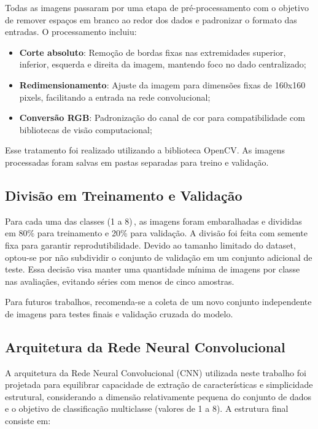 Todas as imagens passaram por uma etapa de pré-processamento com o objetivo de remover 
espaços em branco ao redor dos dados e padronizar o formato das entradas. O processamento incluiu:

\begin{itemize}
\item \textbf{Corte absoluto}: Remoção de bordas fixas nas extremidades superior, inferior, 
esquerda e direita da imagem, mantendo foco no dado centralizado;
\item \textbf{Redimensionamento}: Ajuste da imagem para dimensões fixas de 160x160 pixels, 
facilitando a entrada na rede convolucional;
\item \textbf{Conversão RGB}: Padronização do canal de cor para compatibilidade com bibliotecas 
de visão computacional;
\end{itemize}

Esse tratamento foi realizado utilizando a biblioteca OpenCV. As imagens processadas foram salvas 
em pastas separadas para treino e validação.
\subsection{Divisão em Treinamento e Validação}

Para cada uma das classes (1 a 8)\,, as imagens foram embaralhadas e divididas em 80\% para 
treinamento e 20\% para validação. A divisão foi feita com semente fixa para garantir 
reprodutibilidade. Devido ao tamanho limitado do dataset, optou-se por não subdividir o 
conjunto de validação em um conjunto adicional de teste. Essa decisão visa manter uma 
quantidade mínima de imagens por classe nas avaliaçães, evitando séries com menos de cinco amostras.

Para futuros trabalhos, recomenda-se a coleta de um novo conjunto independente de imagens para 
testes finais e validação cruzada do modelo.

\subsection{Arquitetura da Rede Neural Convolucional}

A arquitetura da Rede Neural Convolucional (CNN) utilizada neste trabalho foi projetada para equilibrar 
capacidade de extração de características e simplicidade estrutural, considerando a dimensão relativamente 
pequena do conjunto de dados e o objetivo de classificação multiclasse (valores de 1 a 8). A estrutura final consiste em:

